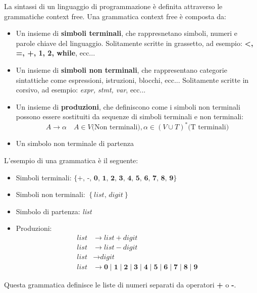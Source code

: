 \documentclass[a4paper]{article}
\begin{document}
\vspace{1em}
\noindent
La sintassi di un linguaggio di programmazione è definita attraverso le grammatiche
context free. Una grammatica context free è composta da:
\begin{itemize}
  \item Un insieme di \textbf{simboli terminali}, che rappresnetano simboli, numeri
    e parole chiave del linguaggio. Solitamente scritte in grassetto, ad esempio:
    \textbf{<, =, +, 1, 2, while}, ecc...

  \item Un insieme di \textbf{simboli non terminali}, che rappresentano categorie sintattiche
    come espressioni, istruzioni, blocchi, ecc... Solitamente scritte in corsivo, ad esempio:
    \textit{expr, stmt, var}, ecc...

  \item Un insieme di \textbf{produzioni}, che definiscono come i simboli non terminali
    possono essere sostituiti da sequenze di simboli terminali e non terminali:
    \[
      A \rightarrow \alpha \quad A \in V \text{(Non terminali)}, \alpha \in (V \cup T)^* \text{(T terminali)}
    \] 

  \item Un simbolo non terminale di partenza
\end{itemize}

\begin{example}
  \label{example:grammatica}
  L'esempio di una grammatica è il seguente:
  \begin{itemize}
    \item Simboli terminali:
      \( \{ \textbf{+, -, 0, 1, 2, 3, 4, 5, 6, 7, 8, 9} \}  \) 

    \item Simboli non terminali:
      \( \left\{ \textit{list, digit} \right\} \) 

    \item Simbolo di partenza: \textit{list}

    \item Produzioni:
      \[
        \begin{aligned}
          \textit{list} &\to \textit{list} + \textit{digit} \\
          \textit{list} &\to \textit{list} - \textit{digit} \\
          \textit{list} &\to \textit{digit} \\
          \textit{list} &\to \textbf{0} \mid \textbf{1} \mid \textbf{2} \mid \textbf{3} \mid \textbf{4} \mid \textbf{5} \mid \textbf{6} \mid \textbf{7} \mid \textbf{8} \mid \textbf{9}
        \end{aligned}
      \]
  \end{itemize}
  Questa grammatica definisce le liste di numeri separati da operatori \textbf{+} o
  \textbf{-}.
\end{example}
\end{document}
